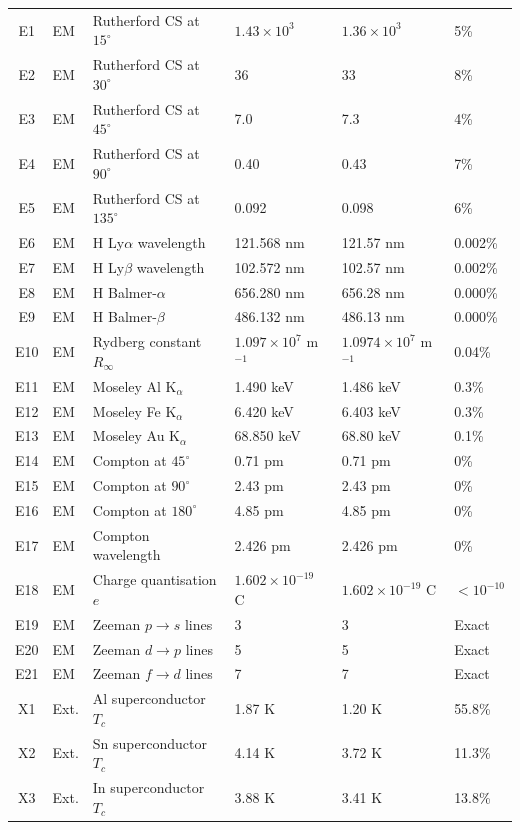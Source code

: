 \begin{longtable}{@{}clp{4.2cm}p{3cm}p{3cm}l@{}}
E1  & EM & Rutherford CS at $15^{\circ}$ & $1.43\times10^3$ & $1.36\times10^3$ & 5\% \\
E2  & EM & Rutherford CS at $30^{\circ}$ & 36 & 33 & 8\% \\
E3  & EM & Rutherford CS at $45^{\circ}$ & 7.0 & 7.3 & 4\% \\
E4  & EM & Rutherford CS at $90^{\circ}$ & 0.40 & 0.43 & 7\% \\
E5  & EM & Rutherford CS at $135^{\circ}$ & 0.092 & 0.098 & 6\% \\
E6  & EM & H Ly$\alpha$ wavelength & 121.568 nm & 121.57 nm & 0.002\% \\
E7  & EM & H Ly$\beta$ wavelength & 102.572 nm & 102.57 nm & 0.002\% \\
E8  & EM & H Balmer-$\alpha$ & 656.280 nm & 656.28 nm & 0.000\% \\
E9  & EM & H Balmer-$\beta$ & 486.132 nm & 486.13 nm & 0.000\% \\
E10 & EM & Rydberg constant $R_\infty$ & $1.097\times10^7$ m$^{-1}$ & $1.0974\times10^7$ m$^{-1}$ & 0.04\% \\
E11 & EM & Moseley Al K$_\alpha$ & 1.490 keV & 1.486 keV & 0.3\% \\
E12 & EM & Moseley Fe K$_\alpha$ & 6.420 keV & 6.403 keV & 0.3\% \\
E13 & EM & Moseley Au K$_\alpha$ & 68.850 keV & 68.80 keV & 0.1\% \\
E14 & EM & Compton at $45^{\circ}$ & 0.71 pm & 0.71 pm & 0\% \\
E15 & EM & Compton at $90^{\circ}$ & 2.43 pm & 2.43 pm & 0\% \\
E16 & EM & Compton at $180^{\circ}$ & 4.85 pm & 4.85 pm & 0\% \\
E17 & EM & Compton wavelength & 2.426 pm & 2.426 pm & 0\% \\
E18 & EM & Charge quantisation $e$ & $1.602\times10^{-19}$ C & $1.602\times10^{-19}$ C & $<10^{-10}$ \\
E19 & EM & Zeeman $p\to s$ lines & 3 & 3 & Exact \\
E20 & EM & Zeeman $d\to p$ lines & 5 & 5 & Exact \\
E21 & EM & Zeeman $f\to d$ lines & 7 & 7 & Exact \\
X1  & Ext. & Al superconductor $T_c$ & 1.87 K & 1.20 K & 55.8\% \\
X2  & Ext. & Sn superconductor $T_c$ & 4.14 K & 3.72 K & 11.3\% \\
X3  & Ext. & In superconductor $T_c$ & 3.88 K & 3.41 K & 13.8\% \\

\end{longtable}

